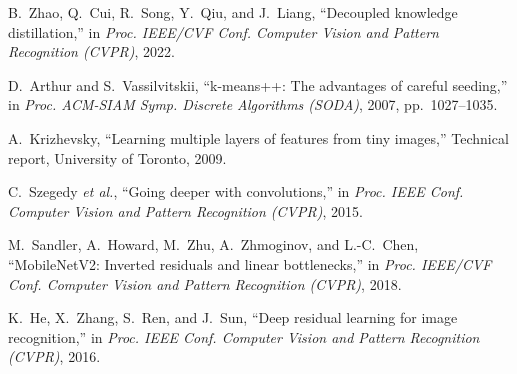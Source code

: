 B.~Zhao, Q.~Cui, R.~Song, Y.~Qiu, and J.~Liang, ``Decoupled knowledge distillation,'' in \emph{Proc. IEEE/CVF Conf. Computer Vision and Pattern Recognition (CVPR)}, 2022.

D.~Arthur and S.~Vassilvitskii, ``k-means++: The advantages of careful seeding,'' in \emph{Proc. ACM-SIAM Symp. Discrete Algorithms (SODA)}, 2007, pp.~1027--1035.

A.~Krizhevsky, ``Learning multiple layers of features from tiny images,'' Technical report, University of Toronto, 2009.

C.~Szegedy \emph{et al.}, ``Going deeper with convolutions,'' in \emph{Proc. IEEE Conf. Computer Vision and Pattern Recognition (CVPR)}, 2015.

M.~Sandler, A.~Howard, M.~Zhu, A.~Zhmoginov, and L.-C.~Chen, ``MobileNetV2: Inverted residuals and linear bottlenecks,'' in \emph{Proc. IEEE/CVF Conf. Computer Vision and Pattern Recognition (CVPR)}, 2018.

K.~He, X.~Zhang, S.~Ren, and J.~Sun, ``Deep residual learning for image recognition,'' in \emph{Proc. IEEE Conf. Computer Vision and Pattern Recognition (CVPR)}, 2016.

